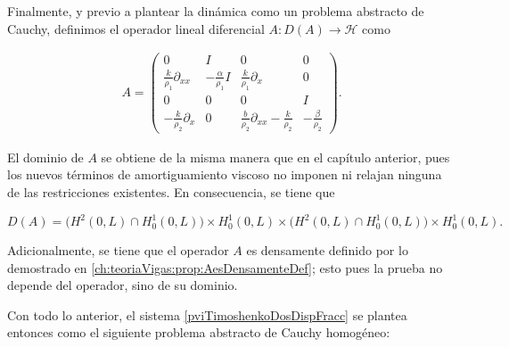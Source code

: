 Finalmente, y previo a plantear la dinámica como un problema abstracto de Cauchy, definimos el operador lineal diferencial $A : D(A) \rightarrow \mathcal{H}$ como

\begin{align}
    \label{operadorATimoDosAmortig}
    A = 
    \begin{pmatrix}
        0 & I & 0 & 0\\
        \frac{k}{\rho_1}\partial_{xx} & -\frac{\alpha}{\rho_1}I & \frac{k}{\rho_1}\partial_x & 0\\
        0 & 0 & 0 & I\\
        -\frac{k}{\rho_2}\partial_x & 0 & \frac{b}{\rho_2}\partial_{xx} - \frac{k}{\rho_2} & -\frac{\beta}{\rho_2}
    \end{pmatrix}.
\end{align}

El dominio de $A$ se obtiene de la misma manera que en el capítulo anterior, pues los nuevos términos de amortiguamiento viscoso no imponen ni relajan ninguna de las restricciones existentes. En consecuencia, se tiene que

\[
    D(A) = \Big(H^2(0,L) \cap H_0^1(0,L) \Big) \times H_0^1(0,L) \times \Big(H^2(0,L) \cap H_0^1(0,L) \Big) \times H_0^1(0,L).
\]

Adicionalmente, se tiene que el operador $A$ es densamente definido por lo demostrado en \ref{ch:teoriaVigas:prop:AesDensamenteDef}; esto pues la prueba no depende del operador, sino de su dominio. 

Con todo lo anterior, el sistema \eqref{pviTimoshenkoDosDispFracc} se plantea entonces como el siguiente problema abstracto de Cauchy homogéneo:

